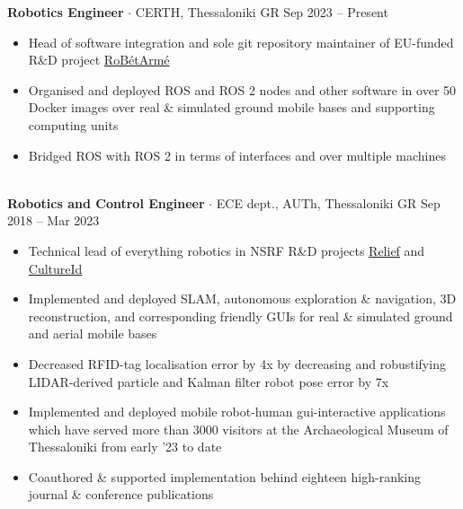 \documentclass[a4paper,10pt,twoside]{article}
\begin{document}
  \textbf{Robotics Engineer} $\cdot$ CERTH, Thessaloniki GR \hfill Sep 2023 -- Present \\
  \begin{minipage}[t]{\textwidth}
    \begin{itemize}
      \item Head of software integration and sole git repository maintainer of EU-funded R\&D project \href{https://www.robetarme-project.eu/}{RoBétArmé}\vspace{-0.8em}
      \item Organised and deployed ROS and ROS 2 nodes and other software in over 50 Docker images over real \& simulated ground mobile bases and supporting computing units\vspace{-0.8em}
      \item Bridged ROS with ROS 2 in terms of interfaces and over multiple machines
    \end{itemize}
  \end{minipage} \\[0.4em]

  \textbf{Robotics and Control Engineer} $\cdot$ ECE dept., AUTh, Thessaloniki GR \hfill Sep 2018 -- Mar 2023 \\
  \begin{minipage}[t]{\textwidth}
    \begin{itemize}
      \item Technical lead of everything robotics in NSRF R\&D projects \href{https://relief.web.auth.gr/language/en/home/}{Relief} and \href{https://cultureid.web.auth.gr/?page\_id=200&lang=en}{CultureId} \vspace{-0.8em}
      \item Implemented and deployed SLAM, autonomous exploration \& navigation, 3D reconstruction, and corresponding friendly GUIs for real \& simulated ground and aerial mobile bases\vspace{-0.8em}
      \item Decreased RFID-tag localisation error by 4x by decreasing and robustifying LIDAR-derived particle and Kalman filter robot pose error by 7x \vspace{-0.8em}
      \item Implemented and deployed mobile robot-human gui-interactive applications which have served more than 3000 visitors at the Archaeological Museum of Thessaloniki from early '23 to date \vspace{-0.8em}
      \item Coauthored \& supported implementation behind eighteen high-ranking journal \& conference publications
    \end{itemize}
  \end{minipage} \\[0.4em]
\end{document}
